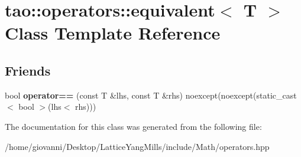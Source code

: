 \hypertarget{classtao_1_1operators_1_1equivalent_3_01T_01_4}{}\section{tao\+:\+:operators\+:\+:equivalent$<$ T $>$ Class Template Reference}
\label{classtao_1_1operators_1_1equivalent_3_01T_01_4}
\subsection*{Friends}
\begin{DoxyCompactItemize}
\item 
bool {\bfseries operator==} (const T \&lhs, const T \&rhs) noexcept(noexcept(static\+\_\+cast$<$ bool $>$(lhs$<$ rhs)))\hypertarget{classtao_1_1operators_1_1equivalent_3_01T_01_4_a86ada736ca97bc1da459a94ba9f33ae9}{}\label{classtao_1_1operators_1_1equivalent_3_01T_01_4_a86ada736ca97bc1da459a94ba9f33ae9}

\end{DoxyCompactItemize}


The documentation for this class was generated from the following file\+:\begin{DoxyCompactItemize}
\item 
/home/giovanni/\+Desktop/\+Lattice\+Yang\+Mills/include/\+Math/operators.\+hpp\end{DoxyCompactItemize}

